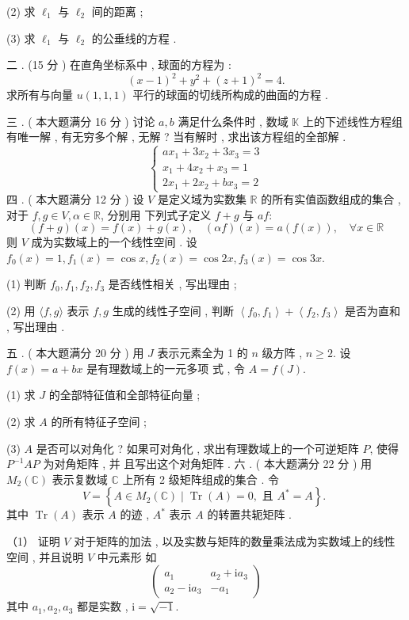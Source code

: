 \documentclass[10pt]{article}
\begin{document}
(2)  求  $\ell_{1}$  与  $\ell_{2}$  间的距离 ;

(3)  求  $\ell_{1}$  与  $\ell_{2}$  的公垂线的方程 .

 二 . (15  分 )  在直角坐标系中 ,  球面的方程为 :
$$
(x-1)^{2}+y^{2}+(z+1)^{2}=4 .
$$
 求所有与向量  $u(1,1,1)$  平行的球面的切线所构成的曲面的方程 .

 三 . ( 本大题满分  16  分 )  讨论  $a, b$  满足什么条件时 ,  数域  $\mathbb{K}$  上的下述线性方程组有唯一解 ,  有无穷多个解 ,  无解 ?  当有解时 ,  求出该方程组的全部解 .
$$
\left\{\begin{array}{r}
a x_{1}+3 x_{2}+3 x_{3}=3 \\
x_{1}+4 x_{2}+x_{3}=1 \\
2 x_{1}+2 x_{2}+b x_{3}=2
\end{array}\right.
$$
 四 . ( 本大题满分  12  分 )  设  $V$  是定义域为实数集  $\mathbb{R}$  的所有实值函数组成的集合 ,  对于  $f, g \in V, \alpha \in \mathbb{R}$,  分别用   下列式子定义  $f+g$  与  $a f:$
$$
(f+g)(x)=f(x)+g(x), \quad(\alpha f)(x)=a(f(x)), \quad \forall x \in \mathbb{R}
$$
 则  $V$  成为实数域上的一个线性空间 .  设  $f_{0}(x)=1, f_{1}(x)=\cos x, f_{2}(x)=\cos 2 x, f_{3}(x)=\cos 3 x$.

(1)  判断  $f_{0}, f_{1}, f_{2}, f_{3}$  是否线性相关 ,  写出理由 ;

(2)  用  $\langle f, g\rangle$  表示  $f, g$  生成的线性子空间 ,  判断  $\left\langle f_{0}, f_{1}\right\rangle+\left\langle f_{2}, f_{3}\right\rangle$  是否为直和 ,  写出理由 .

 五 . ( 本大题满分  20  分 )  用  $J$  表示元素全为  1  的  $n$  级方阵 , $n \geqslant 2$.  设  $f(x)=a+b x$  是有理数域上的一元多项   式 ,  令  $A=f(J)$.

(1)  求  $J$  的全部特征值和全部特征向量 ;

(2)  求  $A$  的所有特征子空间 ;

(3) $A$  是否可以对角化 ?  如果可对角化 ,  求出有理数域上的一个可逆矩阵  $P$,  使得  $P^{-1} A P$  为对角矩阵 ,  并   且写出这个对角矩阵 .  六 . ( 本大题满分  22  分 )  用  $M_{2}(\mathbb{C})$  表示复数域  $\mathbb{C}$  上所有  2  级矩阵组成的集合 .  令 
$$
V=\left\{A \in M_{2}(\mathbb{C}) \mid \operatorname{Tr}(A)=0, \text { 且 } A^{*}=A\right\} \text {. }
$$
 其中  $\operatorname{Tr}(A)$  表示  $A$  的迹 , $A^{*}$  表示  $A$  的转置共轭矩阵 .

（1） 证明  $V$  对于矩阵的加法 ,  以及实数与矩阵的数量乘法成为实数域上的线性空间 ,  并且说明  $V$  中元素形   如 
$$
\left(\begin{array}{cc}
a_{1} & a_{2}+\mathrm{i} a_{3} \\
a_{2}-\mathrm{i} a_{3} & -a_{1}
\end{array}\right)
$$
 其中  $a_{1}, a_{2}, a_{3}$  都是实数 , $\mathrm{i}=\sqrt{-1}$.
\end{document}
